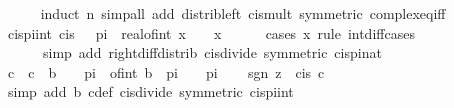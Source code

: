 \begin{isabellebody}
\ \ \ \ \isamarkupfalse%
\ {\isacharparenleft}{\kern0pt}induct\ n{\isacharparenright}{\kern0pt}\ {\isacharparenleft}{\kern0pt}simp{\isacharunderscore}{\kern0pt}all\ add{\isacharcolon}{\kern0pt}\ distrib{\isacharunderscore}{\kern0pt}left\ cis{\isacharunderscore}{\kern0pt}mult\ {\isacharbrackleft}{\kern0pt}symmetric{\isacharbrackright}{\kern0pt}\ complex{\isacharunderscore}{\kern0pt}eq{\isacharunderscore}{\kern0pt}iff{\isacharparenright}{\kern0pt}\isanewline
\ \ \isamarkupfalse%
\ cis{\isacharunderscore}{\kern0pt}{}pi{\isacharunderscore}{\kern0pt}int{\isacharcolon}{\kern0pt}\ {\isachardoublequoteopen}cis\ {\isacharparenleft}{\kern0pt}{}\ {\isacharasterisk}{\kern0pt}\ pi\ {\isacharasterisk}{\kern0pt}\ real{\isacharunderscore}{\kern0pt}of{\isacharunderscore}{\kern0pt}int\ x{\isacharparenright}{\kern0pt}\ {\isacharequal}{\kern0pt}\ {}{\isachardoublequoteclose}\ \ x\isanewline
\ \ \ \ \isamarkupfalse%
\ {\isacharparenleft}{\kern0pt}cases\ x\ rule{\isacharcolon}{\kern0pt}\ int{\isacharunderscore}{\kern0pt}diff{\isacharunderscore}{\kern0pt}cases{\isacharparenright}{\kern0pt}\isanewline
\ \ \ \ \ \ {\isacharparenleft}{\kern0pt}simp\ add{\isacharcolon}{\kern0pt}\ right{\isacharunderscore}{\kern0pt}diff{\isacharunderscore}{\kern0pt}distrib\ cis{\isacharunderscore}{\kern0pt}divide\ {\isacharbrackleft}{\kern0pt}symmetric{\isacharbrackright}{\kern0pt}\ cis{\isacharunderscore}{\kern0pt}{}pi{\isacharunderscore}{\kern0pt}nat{\isacharparenright}{\kern0pt}\isanewline
\ \ \isamarkupfalse%
\ c\ \ {\isachardoublequoteopen}c\ {\isacharequal}{\kern0pt}\ b\ {\isacharminus}{\kern0pt}\ {}\ {\isacharasterisk}{\kern0pt}\ pi\ {\isacharasterisk}{\kern0pt}\ of{\isacharunderscore}{\kern0pt}int\ {\isasymlceil}{\isacharparenleft}{\kern0pt}b\ {\isacharminus}{\kern0pt}\ pi{\isacharparenright}{\kern0pt}\ {\isacharslash}{\kern0pt}\ {\isacharparenleft}{\kern0pt}{}\ {\isacharasterisk}{\kern0pt}\ pi{\isacharparenright}{\kern0pt}{\isasymrceil}{\isachardoublequoteclose}\isanewline
\ \ \isamarkupfalse%
\ {\isachardoublequoteopen}sgn\ z\ {\isacharequal}{\kern0pt}\ cis\ c{\isachardoublequoteclose}\isanewline
\ \ \ \ \isamarkupfalse%
\ {\isacharparenleft}{\kern0pt}simp\ add{\isacharcolon}{\kern0pt}\ b\ c{\isacharunderscore}{\kern0pt}def\ cis{\isacharunderscore}{\kern0pt}divide\ {\isacharbrackleft}{\kern0pt}symmetric{\isacharbrackright}{\kern0pt}\ cis{\isacharunderscore}{\kern0pt}{}pi{\isacharunderscore}{\kern0pt}int{\isacharparenright}{\kern0pt}\isanewline

\end{isabellebody}
